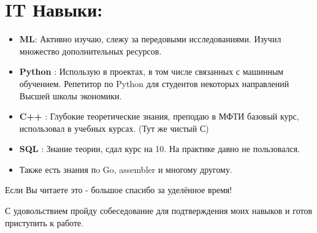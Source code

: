 \documentclass[a4paper,12pt]{article}
\begin{document}
\section*{IT Навыки:}
\begin{itemize}
\item \textbf{ML}: Активно изучаю, слежу за передовыми исследованиями. Изучил множество дополнительных ресурсов.
\item \textbf{Python} : Использую в проектах, в том числе связанных с машинным обучением. Репетитор по Python для студентов некоторых направлений Высшей школы экономики.
\item \textbf{C++} : Глубокие теоретические знания, преподаю в МФТИ базовый курс, использовал в учебных курсах. (Тут же чистый С)
\item \textbf{SQL} : Знание теории, сдал курс на 10. На практике давно не пользовался.
\item Также есть знания пo Go, assembler и многому другому.
\end{itemize}

Если Вы читаете это - большое спасибо за уделённое время! 

С удовольствием пройду собеседование для подтверждения моих навыков и готов приступить к работе.
\end{document}
